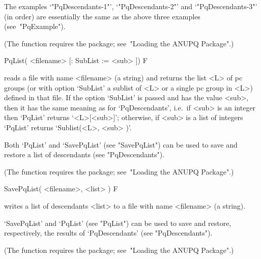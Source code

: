 The     examples     `"PqDescendants-1"',     `"PqDescendants-2"'     and
`"PqDescendants-3"' (in order) are essentially  the  same  as  the  above
three examples (see~"PqExample").

(The function requires  the  {\ANUPQ}  package;  see~"Loading  the  ANUPQ
Package".)

\>PqList( <filename> [: SubList := <sub> ]) F

reads a file with name <filename> (a string) and returns the list <L>  of
pc groups (or with option `SubList' a sublist of <L> or a single pc group
in <L>) defined in that file. If the option `SubList' is passed  and  has
the value <sub>, then it has the same  meaning  as  for  `PqDescendants',
i.e.~if  <sub>  is  an  integer  then  `PqList'   returns   `<L>[<sub>]';
otherwise, if <sub> is a list of integers `PqList' returns  `Sublist(<L>,
<sub> )'.

Both `PqList' and `SavePqList' (see "SavePqList") can be used to save and
restore a list of descendants (see "PqDescendants").

(The function requires  the  {\ANUPQ}  package;  see~"Loading  the  ANUPQ
Package".)

\>SavePqList( <filename>, <list> ) F

writes a list of descendants <list> to a file  with  name  <filename>  (a
string).

`SavePqList' and `PqList' (see "PqList") can be used to save and restore,
respectively, the results of `PqDescendants' (see "PqDescendants").

(The function requires  the  {\ANUPQ}  package;  see~"Loading  the  ANUPQ
Package".)

